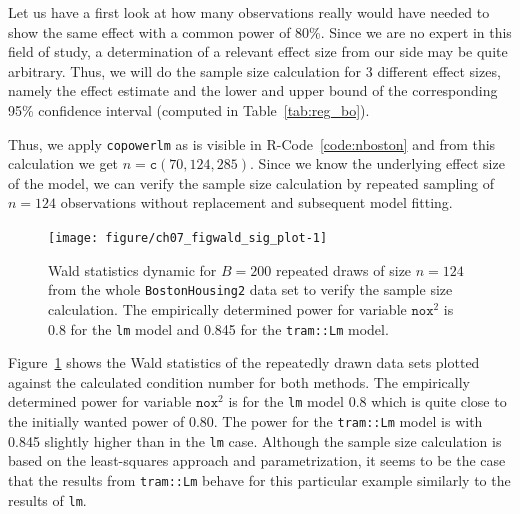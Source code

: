 \documentclass[11pt,a4paper,twoside]{book}\usepackage[]{graphicx}\usepackage[]{xcolor}
\newenvironment{knitrout}{}{} %
\begin{document}
Let us have a first look at how many observations \cite{Harrison1978} really would have needed to show the same effect with a common power of 80\%. Since we are no expert in this field of study, a determination of a relevant effect size from our side may be quite arbitrary. Thus, we will do the sample size calculation for 3 different effect sizes, namely the effect estimate and the lower and upper bound of the corresponding 95\% confidence interval (computed in Table~\ref{tab:reg_bo}).

Thus, we apply \texttt{copowerlm} as is visible in \textsf{R}-Code~\ref{code:nboston} and from this calculation we get $n=\texttt{c}\left(70, 124, 285\right)$. Since we know the underlying effect size of the model, we can verify the sample size calculation by repeated sampling of $n=124$ observations without replacement and subsequent model fitting.



\begin{figure}[h!]%
\begin{center}
\begin{knitrout}
\color{fgcolor}
\texttt{[image: figure/ch07\_figwald\_sig\_plot-1]} 
\end{knitrout}
\end{center}
\vspace*{-0.7cm}
\caption{Wald statistics dynamic for $B=200$ repeated draws of size $n=124$ from the whole \texttt{BostonHousing2} data set to verify the sample size calculation. The empirically determined power for variable $\texttt{nox}^2$ is 0.8 for the \texttt{lm} model and 0.845 for the \texttt{tram::Lm} model.}
\label{fig:wald_sig_plot}
\end{figure}

Figure~\ref{fig:wald_sig_plot} shows the Wald statistics of the repeatedly drawn data sets plotted against the calculated condition number for both methods. The empirically determined power for variable $\texttt{nox}^2$ is for the \texttt{lm} model 0.8 which is quite close to the initially wanted power of 0.80. The power for the \texttt{tram::Lm} model is with 0.845 slightly higher than in the \texttt{lm} case. Although the sample size calculation is based on the least-squares approach and parametrization, it seems to be the case that the results from \texttt{tram::Lm} behave for this particular example similarly to the results of \texttt{lm}.

\end{document}
